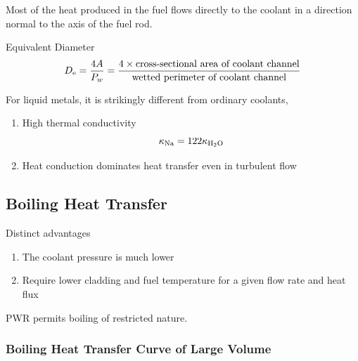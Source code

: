Most of the heat produced in the fuel flows directly to the coolant in a direction normal to the axis of the fuel rod.

Equivalent Diameter
\begin{equation}
    D_{\rm e} = \frac{4A}{P_w} = \frac{4\times \text{cross-sectional area of coolant channel}}{\text{wetted perimeter of coolant channel}}
\end{equation}

For liquid metals, it is strikingly different from ordinary coolants, 
\begin{enumerate}
    \item High thermal conductivity
    \begin{equation}
        \kappa_{\rm Na} = 122 \kappa_{\rm H_2 O}
    \end{equation}
    \item Heat conduction dominates heat transfer even in turbulent flow
\end{enumerate}

\subsection{Boiling Heat Transfer}

Distinct advantages
\begin{enumerate}
    \item The coolant pressure is much lower
    \item Require lower cladding and fuel temperature for a given flow rate and heat flux
\end{enumerate}

\begin{tip}
    PWR permits boiling of restricted nature.
\end{tip}

\subsubsection*{Boiling Heat Transfer Curve of Large Volume}

